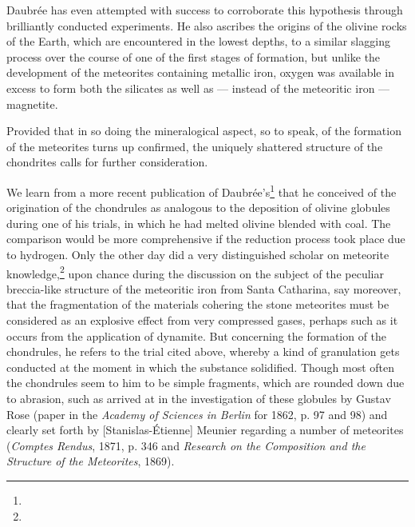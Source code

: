 \documentclass[a4paper, 12pt, oneside]{article}
\begin{document}
Daubrée has even attempted with success to corroborate this hypothesis through brilliantly conducted experiments. He also ascribes the origins of the olivine rocks of the Earth, which are encountered in the lowest depths, to a similar slagging process over the course of one of the first stages of formation, but unlike the development of the meteorites containing metallic iron, oxygen was available in excess to form both the silicates as well as --- instead of the meteoritic iron --- magnetite.

Provided that in so doing the mineralogical aspect, so to speak, of the formation of the meteorites turns up confirmed, the uniquely shattered structure of the chondrites calls for further consideration.

We learn from a more recent publication of Daubrée's\footnote{} that he conceived of the origination of the chondrules as analogous to the deposition of olivine globules during one of his trials, in which he had melted olivine blended with coal. The comparison would be more comprehensive if the reduction process took place due to hydrogen. Only the other day did a very distinguished scholar on meteorite knowledge,\footnote{} upon chance during the discussion on the subject of the peculiar breccia-like structure of the meteoritic iron from Santa Catharina, say moreover, that the fragmentation of the materials cohering the stone meteorites must be considered as an explosive effect from very compressed gases, perhaps such as it occurs from the application of dynamite. But concerning the formation of the chondrules, he refers to the trial cited above, whereby a kind of granulation gets conducted at the moment in which the substance solidified. Though most often the chondrules seem to him to be simple fragments, which are rounded down due to abrasion, such as arrived at in the investigation of these globules by Gustav Rose (paper in the \emph{Academy of Sciences in Berlin} for 1862, p. 97 and 98) and clearly set forth by [Stanislas-Étienne] Meunier regarding a number of meteorites (\emph{Comptes Rendus}, 1871, p. 346 and \emph{Research on the Composition and the Structure of the Meteorites}, 1869).
\end{document}
